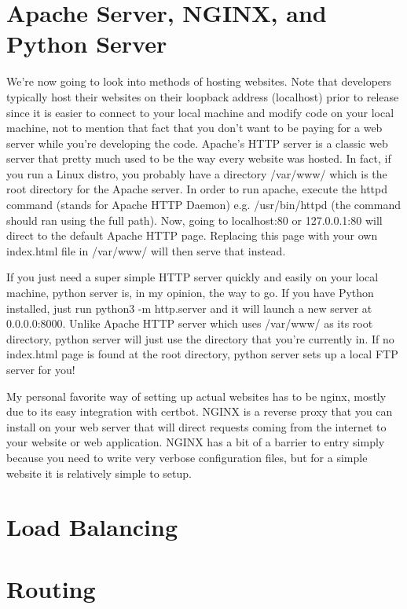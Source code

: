 \documentclass{article}
\begin{document}
\section{Apache Server, NGINX, and Python Server}

We're now going to look into methods of hosting websites. Note that developers typically host their websites on
their loopback address (localhost) prior to release since it is easier to connect to your local machine and
modify code on your local machine, not to mention that fact that you don't want to be paying for a web server
while you're developing the code. Apache's HTTP server is a classic web server that pretty much used to be the
way every website was hosted. In fact, if you run a Linux distro, you probably have a directory /var/www/ which
is the root directory for the Apache server. In order to run apache, execute the httpd command (stands for
Apache HTTP Daemon) e.g. /usr/bin/httpd (the command should ran using the full path). Now, going to
localhost:80 or 127.0.0.1:80 will direct to the default Apache HTTP page. Replacing this page with your own
index.html file in /var/www/ will then serve that instead.

If you just need a super simple HTTP server quickly and easily on your local machine, python server is, in my
opinion, the way to go. If you have Python installed, just run python3 -m http.server and it will launch a new
server at 0.0.0.0:8000. Unlike Apache HTTP server which uses /var/www/ as its root directory, python server will
just use the directory that you're currently in. If no index.html page is found at the root directory, python
server sets up a local FTP server for you!

My personal favorite way of setting up actual websites has to be nginx, mostly due to its easy integration with
certbot. NGINX is a reverse proxy that you can install on your web server that will direct requests coming
from the internet to your website or web application. NGINX has a bit of a barrier to entry simply because you
need to write very verbose configuration files, but for a simple website it is relatively simple to setup.

\section{Load Balancing}

\section{Routing}
\end{document}
